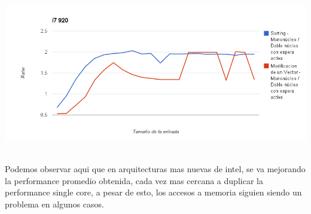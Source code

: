 	\begin{center}
	    \includegraphics[height=7cm]{images/i7-vectorsum-sorting.png}
	\end{center}

	Podemos observar aqui que en arquitecturas mas nuevas de intel, se va mejorando la performance promedio obtenida, cada vez mas cercana a duplicar la performance single core, a pesar de esto, los accesos a memoria siguien siendo un problema en algunos casos.

